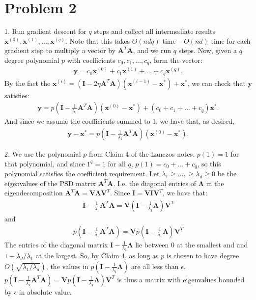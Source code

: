 \documentclass[11pt]{article}
\newcommand{\bs}[1]{\boldsymbol{#1}}
\newcommand{\bv}[1]{\mathbf{#1}}
\begin{document}
	\section*{Problem 2}
	1. Run gradient descent for $q$ steps and collect all intermediate results $\bv{x}^{(0)}, \bv{x}^{(1)}, \ldots, \bv{x}^{(q)}$. Note that this takes $O(ndq)$ time -- $O(nd)$ time for each gradient step to multiply a vector by $\bv{A}^T\bv{A}$, and we run $q$ steps. Now, given a $q$ degree polynomial $p$ with coefficients $c_0, c_1, \ldots, c_q$, form the vector:
	\begin{align*}
		\bv{y} = c_0\bv{x}^{(0)} + c_1\bv{x}^{(1)} + \ldots + c_q\bv{x}^{(q)}. 
	\end{align*}
	By the fact the $\bv{x}^{(i)} = (\bv{I} - 2\eta\bv{A}^T\bv{A})(\bv{x}^{(i-1)} - \bv{x}^*) + \bv{x}^*$, we can check that $\bv{y}$ satisfies:
	\begin{align*}
		\bv{y} = p\left(\bv{I} - \frac{1}{\lambda_1}\bv{A}^T\bv{A}\right)(\bv{x}^{(0)} - \bv{x}^*) + (c_0 + c_1 + \ldots + c_q)\bv{x}^*.
	\end{align*}
	And since we assume the coefficients summed to $1$, we have that, as desired,
	\begin{align*}
		\bv{y} - \bv{x}^* = p\left(\bv{I} - \frac{1}{\lambda_1}\bv{A}^T\bv{A}\right)(\bv{x}^{(0)} - \bv{x}^*).
	\end{align*}

	2. We use the polynomial $p$ from Claim 4 of the Lanczos notes. $p(1) = 1$ for that polynomial, and since $1^q = 1$ for all $q$, $p(1) = c_0 + \ldots + c_q$, so this polynomial satisfies the coefficient requirement. Let $\lambda_1 \geq \ldots, \geq \lambda_d \geq 0$ be the eigenvalues of the PSD matrix $\bv{A}^T\bv{A}$. I.e. the diagonal entries of $\bs{\Lambda}$ in the eigendecomposition $\bv{A}^T\bv{A} = \bv{V}\bs{\Lambda}\bv{V}^T$. Since $\bv{I} = \bv{V}\bv{I}\bv{V}^T$, we have that:
\begin{align*}
	\bv{I} - \frac{1}{\lambda_1}\bv{A}^T\bv{A} = \bv{V}(\bv{I} - \frac{1}{\lambda_1}\bs{\Lambda})\bv{V}^T
\end{align*} 
and
\begin{align*}
	p(\bv{I} - \frac{1}{\lambda_1}\bv{A}^T\bv{A}) = \bv{V}p(\bv{I} - \frac{1}{\lambda_1}\bs{\Lambda})\bv{V}^T
\end{align*} 
The entries of the diagonal matrix $\bv{I} - \frac{1}{\lambda_1}\bs{\Lambda}$ lie between $0$ at the smallest and and $1 -\lambda_d/\lambda_1$ at the largest. So, by Claim 4, as long as $p$ is chosen to have degree $O(\sqrt{\lambda_1/\lambda_d})$, the values in $p(\bv{I} - \frac{1}{\lambda_1}\bs{\Lambda})$ are all less than $\epsilon$. $p(\bv{I} - \frac{1}{\lambda_1}\bv{A}^T\bv{A})  = \bv{V}p(\bv{I} - \frac{1}{\lambda_1}\bs{\Lambda})\bv{V}^T$ is thus a matrix with eigenvalues bounded by $\epsilon$ in absolute value. 
\end{document}
